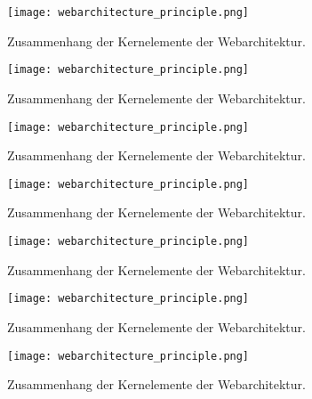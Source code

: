 \begin{figure}[H]
	\centering
	\texttt{[image: webarchitecture\_principle.png]}
	\caption[Zusammenhang der Kernelemente der Webarchitektur]{Zusammenhang der Kernelemente der Webarchitektur.\protect\footnotemark}
\end{figure}
\begin{figure}[H]
	\centering
	\texttt{[image: webarchitecture\_principle.png]}
	\caption[Zusammenhang der Kernelemente der Webarchitektur]{Zusammenhang der Kernelemente der Webarchitektur.\protect\footnotemark}
\end{figure}
\begin{figure}[H]
	\centering
	\texttt{[image: webarchitecture\_principle.png]}
	\caption[Zusammenhang der Kernelemente der Webarchitektur]{Zusammenhang der Kernelemente der Webarchitektur.\protect\footnotemark}
\end{figure}
\begin{figure}[H]
	\centering
	\texttt{[image: webarchitecture\_principle.png]}
	\caption[Zusammenhang der Kernelemente der Webarchitektur]{Zusammenhang der Kernelemente der Webarchitektur.\protect\footnotemark}
\end{figure}
\begin{figure}[H]
	\centering
	\texttt{[image: webarchitecture\_principle.png]}
	\caption[Zusammenhang der Kernelemente der Webarchitektur]{Zusammenhang der Kernelemente der Webarchitektur.\protect\footnotemark}
\end{figure}
\begin{figure}[H]
	\centering
	\texttt{[image: webarchitecture\_principle.png]}
	\caption[Zusammenhang der Kernelemente der Webarchitektur]{Zusammenhang der Kernelemente der Webarchitektur.\protect\footnotemark}
\end{figure}
\begin{figure}[H]
	\centering
	\texttt{[image: webarchitecture\_principle.png]}
	\caption[Zusammenhang der Kernelemente der Webarchitektur]{Zusammenhang der Kernelemente der Webarchitektur.\protect\footnotemark}
\end{figure}